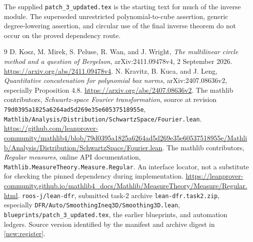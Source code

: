 \documentclass[11pt]{article}
\theoremstyle{definition}
\newcommand{\pid}[1]{\nolinkurl{#1}}
\begin{document}
The supplied \pid{patch_3_updated.tex} is the starting text for much of the inverse module.
The superseded unrestricted polynomial-to-cube assertion, generic degree-lowering assertion,
and circular use of the final inverse theorem do not occur on the proved dependency route.

\begin{thebibliography}{9}
D. Kosz, M. Mirek, S. Peluse, R. Wan, and J. Wright,
\emph{The multilinear circle method and a question of Bergelson},
arXiv:2411.09478v4, 2 September 2026.
\url{https://arxiv.org/abs/2411.09478v4}.
N. Kravitz, B. Kuca, and J. Leng,
\emph{Quantitative concatenation for polynomial box norms},
arXiv:2407.08636v2, especially Proposition 4.8.
\url{https://arxiv.org/abs/2407.08636v2}.
The mathlib contributors, \emph{Schwartz-space Fourier transformation}, source at revision
\pid{79d0395a1825a6264ad5d269e35e60537518955e},
\pid{Mathlib/Analysis/Distribution/SchwartzSpace/Fourier.lean}.
\url{https://github.com/leanprover-community/mathlib4/blob/79d0395a1825a6264ad5d269e35e60537518955e/Mathlib/Analysis/Distribution/SchwartzSpace/Fourier.lean}.
The mathlib contributors, \emph{Regular measures}, online API documentation,
\pid{Mathlib.MeasureTheory.Measure.Regular}. An interface locator, not a substitute for
checking the pinned dependency during implementation.
\url{https://leanprover-community.github.io/mathlib4_docs/Mathlib/MeasureTheory/Measure/Regular.html}.
\texttt{roos-j/lean-dfr}, submitted task-2 archive \pid{lean-dfr.task2.zip}, especially
\pid{DFR/Auto/SmoothingIneq3D/Smoothing3D.lean},
\pid{blueprints/patch_3_updated.tex}, the earlier blueprints, and automation ledgers.
Source version identified by the manifest and archive digest in \cref{new:register}.
\end{thebibliography}
\end{document}
